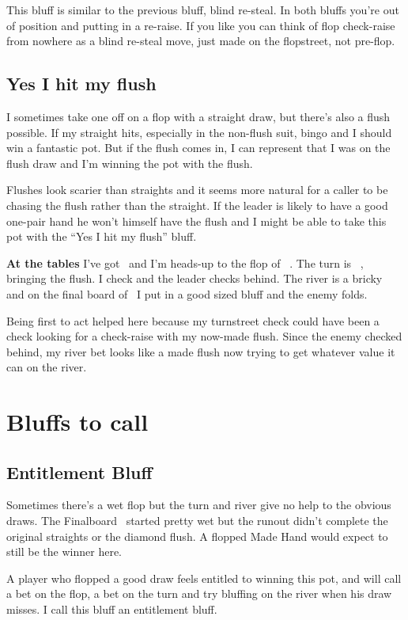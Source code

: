 This bluff is similar to the previous bluff, blind re-steal. In both
bluffs you're out of position and putting in a re-raise. If you like
you can think of flop check-raise from nowhere as a blind re-steal
move, just made on the flopstreet, not pre-flop.

\subsection{Yes I hit my flush}

I sometimes take one off on a flop with a straight draw, but there's
also a flush possible. If my straight hits, especially in the
non-flush suit, bingo and I should win a fantastic pot. But if the
flush comes in, I can represent that I was on the flush draw and I'm
winning the pot with the flush.

Flushes look scarier than straights and it seems more natural for a
caller to be chasing the flush rather than the straight. If the leader
is likely to have a good one-pair hand he won't himself have the flush
and I might be able to take this pot with the ``Yes I hit my flush''
bluff.

\textbf{At the tables} I've got \nineh\eigc\ and I'm heads-up to the
flop of \Ad\tend\sevc\ . The turn is \tred\ , bringing the flush. I
check and the leader checks behind. The river is a bricky \Qc\, and on
the final board of \Ad\tend\sevc\tred\Qc\ I put in a good sized
bluff and the enemy folds.

Being first to act helped here because my turnstreet check could have
been a check looking for a check-raise with my now-made flush. Since
the enemy checked behind, my river bet looks like a made flush now
trying to get whatever value it can on the river.


\section{Bluffs to call}
\subsection{Entitlement Bluff}

Sometimes there's a wet flop but the turn and river give no help
to the obvious draws. The Finalboard \Jd\tend\fivec\twoh\sixs\ started
pretty wet but the runout didn't complete the original straights or the
diamond flush. A flopped Made Hand would expect to still be the winner
here.

A player who flopped a good draw feels entitled to winning
this pot, and will call a bet on the flop, a bet on the turn
and try bluffing on the river when his draw misses. I call
this bluff an entitlement bluff.

